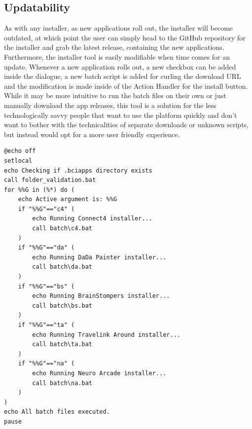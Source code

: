 \subsection{Updatability}
As with any installer, as new applications roll out, the installer will become outdated, at which point the user can simply head to the GitHub repository for the installer and grab the latest release, containing the new applications. Furthermore, the installer tool is easily modifiable when time comes for an update. Whenever a new application rolls out, a new checkbox can be added inside the dialogue, a new batch script is added for curling the download URL and the modification is made inside of the Action Handler for the install button. While it may be more intuitive to run the batch files on their own or just manually download the app releases, this tool is a solution for the less technologically savvy people that want to use the platform quickly and don't want to bother with the technicalities of separate downloads or unknown scripts, but instead would opt for a more user friendly experience.

\begin{lstlisting}[language={[Sharp]C}, caption={Action Handler for the Install Apps button}, label={Script}]
@echo off
setlocal
echo Checking if .bciapps directory exists
call folder_validation.bat
for %%G in (%*) do (
    echo Active argument is: %%G
    if "%%G"=="c4" (
        echo Running Connect4 installer...
        call batch\c4.bat
    )
    if "%%G"=="da" (
        echo Running DaDa Painter installer...
        call batch\da.bat
    )
    if "%%G"=="bs" (
        echo Running BrainStompers installer...
        call batch\bs.bat
    )
    if "%%G"=="ta" (
        echo Running Travelink Around installer...
        call batch\ta.bat
    )
    if "%%G"=="na" (
        echo Running Neuro Arcade installer...
        call batch\na.bat
    )
)
echo All batch files executed.
pause
\end{lstlisting}



